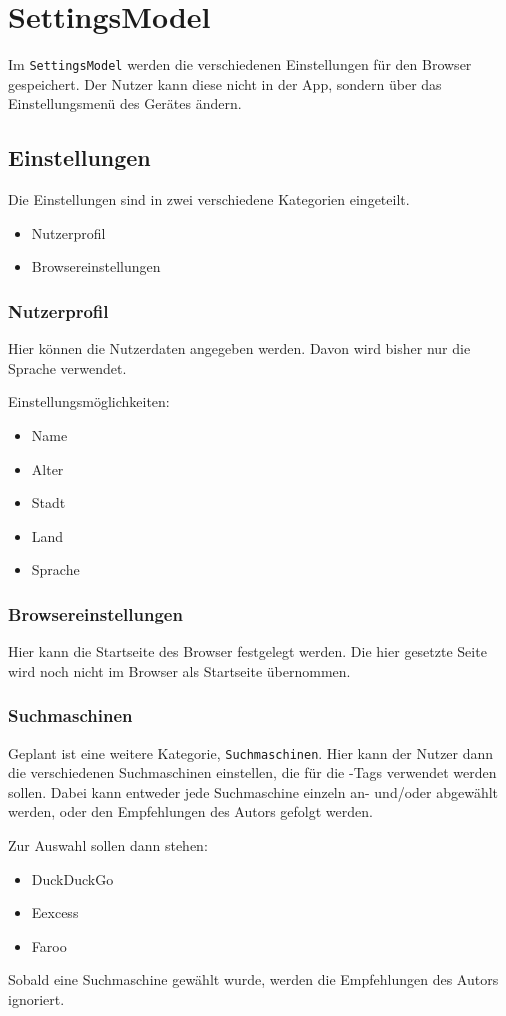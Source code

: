 
\section{SettingsModel}
Im \lstinline|SettingsModel| werden die verschiedenen Einstellungen für den Browser gespeichert. Der Nutzer kann diese nicht in der App, sondern über das Einstellungsmenü des Gerätes ändern.

\subsection{Einstellungen}
Die Einstellungen sind in zwei verschiedene Kategorien eingeteilt.
\begin{itemize}
     \item Nutzerprofil
     \item Browsereinstellungen
\end{itemize}

\subsubsection{Nutzerprofil}  
Hier können die Nutzerdaten angegeben werden. Davon wird bisher nur die Sprache verwendet.

Einstellungsmöglichkeiten:
\begin{itemize}  
     \item Name  
     \item Alter  
     \item Stadt
     \item Land
     \item Sprache
\end{itemize}

\subsubsection{Browsereinstellungen}  
Hier kann die Startseite des Browser festgelegt werden. Die hier gesetzte Seite wird noch nicht im Browser als Startseite übernommen.

\subsubsection{Suchmaschinen}  
Geplant ist eine weitere Kategorie, \lstinline|Suchmaschinen|. Hier kann der Nutzer dann die verschiedenen Suchmaschinen einstellen, die für die \SEARCH-Tags verwendet werden sollen. Dabei kann entweder jede Suchmaschine einzeln an- und/oder abgewählt werden, oder den Empfehlungen des Autors gefolgt werden.

Zur Auswahl sollen dann stehen:
\begin{itemize}  
     \item DuckDuckGo
     \item Eexcess
     \item Faroo  
\end{itemize}
Sobald eine Suchmaschine gewählt wurde, werden die Empfehlungen des Autors ignoriert.
